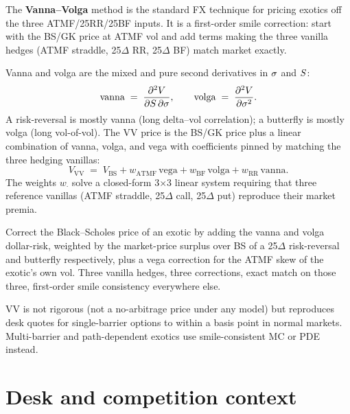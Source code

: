 The \textbf{Vanna--Volga} method \citep{castagna2007consistent} is
the standard FX technique for pricing exotics off the three
ATMF/25RR/25BF inputs.  It is a first-order smile correction: start
with the BS/GK price at ATMF vol and add terms making the three
vanilla hedges (ATMF straddle, 25$\Delta$ RR, 25$\Delta$ BF) match
market exactly.

Vanna and volga are the mixed and pure second derivatives in
$\sigma$ and $S$:
\begin{equation}
  \mathrm{vanna} \;=\;
    \frac{\partial^2 V}{\partial S\, \partial \sigma},
  \qquad
  \mathrm{volga} \;=\;
    \frac{\partial^2 V}{\partial \sigma^2}.
\end{equation}
A risk-reversal is mostly vanna (long delta--vol correlation); a
butterfly is mostly volga (long vol-of-vol).  The VV price is the
BS/GK price plus a linear combination of vanna, volga, and vega with
coefficients pinned by matching the three hedging vanillas:
\begin{equation}
  V_{\mathrm{VV}} \;=\;
  V_{\mathrm{BS}} + w_{\mathrm{ATMF}}\,\mathrm{vega}
                   + w_{\mathrm{BF}}\,\mathrm{volga}
                   + w_{\mathrm{RR}}\,\mathrm{vanna}.
\end{equation}
The weights $w_\cdot$ solve a closed-form 3$\times$3 linear system
requiring that three reference vanillas (ATMF straddle, 25$\Delta$
call, 25$\Delta$ put) reproduce their market premia.

\begin{keyfactbox}
\label{fact:vanna_volga}
Correct the Black--Scholes price of an exotic by adding the vanna
and volga dollar-risk, weighted by the market-price surplus over
BS of a 25$\Delta$ risk-reversal and butterfly respectively, plus
a vega correction for the ATMF skew of the exotic's own vol.
Three vanilla hedges, three corrections, exact match on those
three, first-order smile consistency everywhere else.
\end{keyfactbox}

VV is not rigorous (not a no-arbitrage price under any model) but
reproduces desk quotes for single-barrier options to within a basis
point in normal markets.  Multi-barrier and path-dependent exotics
use smile-consistent MC or PDE instead.


\section{Desk and competition context}
\label{sec:fx_context}

